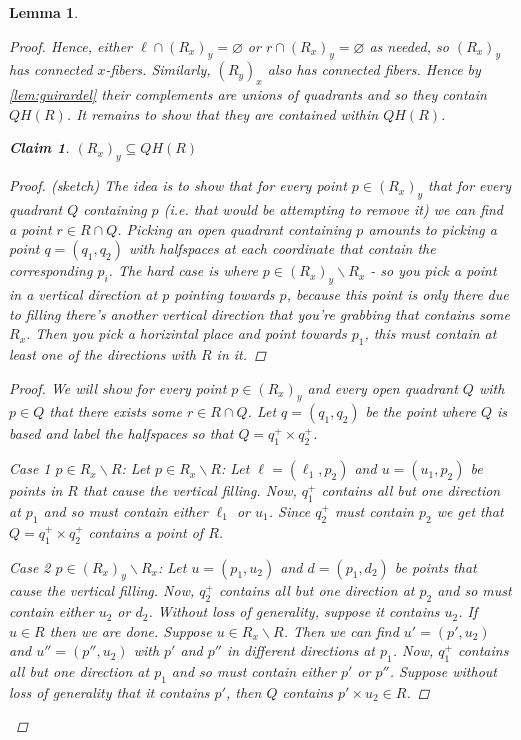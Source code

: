 \documentclass{article}
\newcommand{\rxy}{(R_x)_y}
\newcommand{\ryx}{(R_y)_x}
\theoremstyle{mystyle}
\newtheorem{lem}{Lemma}[section]
\newtheorem*{claim*}{Claim}
\theoremstyle{remark}
\begin{document}
\begin{lem}
\begin{proof}
                Hence, either \(\ell \cap \rxy = \varnothing\) or \(r \cap \rxy = \varnothing\) as needed, so \(\rxy\) has connected \(x\)-fibers. Similarly, \(\ryx\) also has connected fibers. Hence by \ref{lem:guirardel} their complements are unions of quadrants and so they contain \(QH(R)\). It remains to show that they are contained within \(QH(R)\). 

                \begin{claim*}
                    \(\rxy \subseteq QH(R)\) 
                    \begin{proof}
                        (sketch) The idea is to show that for every point \(p \in \rxy\) that for every quadrant \(Q\) containing \(p\) (i.e. that would be attempting to remove it) we can find a point \(r \in R \cap Q\). Picking an open quadrant containing \(p\) amounts to picking a point \(q = (q_{1}, q_2)\) with halfspaces at each coordinate that contain the corresponding \(p_{i}\). The hard case is where \(p \in \rxy \smallsetminus R_x\) - so you pick a point in a vertical direction at \(p\) pointing towards \(p\), because this point is only there due to filling there's another vertical direction that you're grabbing that contains some \(R_x\). Then you pick a horizintal place and point towards \(p_1\), this must contain at least one of the directions with \(R\) in it.
                    \end{proof}

                    \begin{proof}
                        We will show for every point \(p \in \rxy\) and every open quadrant \(Q\) with \(p \in Q\) that there exists some \(r \in R \cap Q\). Let \(q=(q_1,q_2)\) be the point where \(Q\) is based and label the halfspaces so that \(Q=q_1^{+} \times q_{2}^{+}\).

                        Case 1 \(p \in R_x \smallsetminus R\): Let \(p \in R_x \smallsetminus R\): Let \(\ell = (\ell_1,p_2)\) and \(u=(u_1,p_2)\) be points in \(R\) that cause the vertical filling. Now, \(q_1^+\) contains all but one direction at \(p_1\) and so must contain either \(\ell_1\) or \(u_1\). Since \(q_2^+\) must contain \(p_2\) we get that \(Q=q_1^+ \times q_2^+\) contains a point of \(R\).


                        Case 2 \(p \in \rxy \smallsetminus R_x\): Let \(u=(p_1,u_2)\) and \(d=(p_1,d_2)\) be points that cause the vertical filling. Now, \(q_2^+\) contains all but one direction at \(p_2\) and so must contain either \(u_2\) or \(d_2\). Without loss of generality, suppose it contains \(u_2\). If \(u \in R\) then we are done. Suppose \(u \in R_x \smallsetminus R\). Then we can find \(u'=(p',u_2)\) and \(u''=(p'',u_2)\) with \(p'\) and \(p''\) in different directions at \(p_1\). Now, \(q_1^+\) contains all but one direction at \(p_1\) and so must contain either \(p'\) or \(p''\). Suppose without loss of generality that it contains \(p'\), then \(Q\) contains \(p' \times u_2 \in R\).
                    \end{proof}
                \end{claim*}



\end{proof}
\end{lem}
\end{document}
